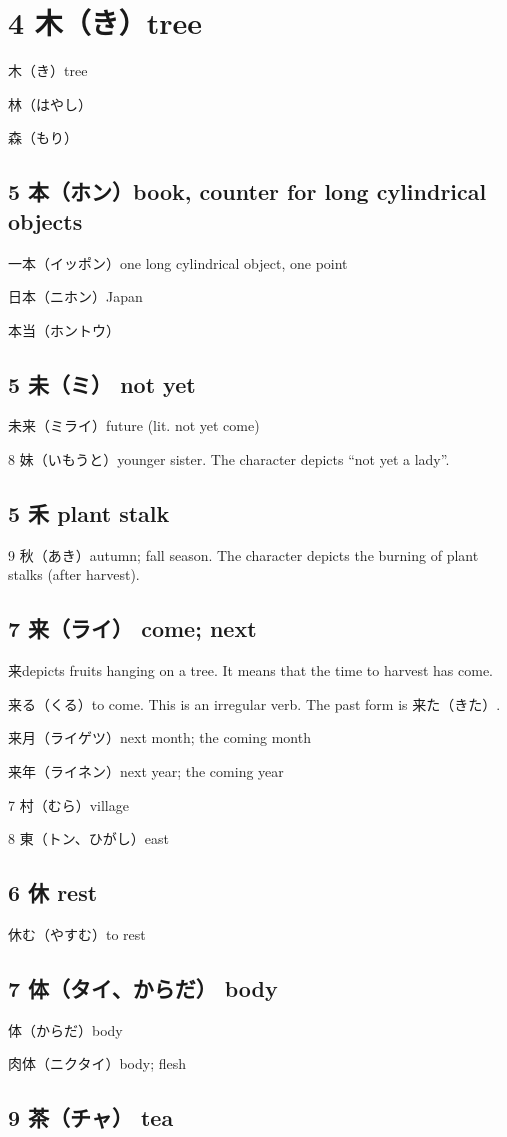\chapter{4 木（き）tree}

木（き）tree

林（はやし）

森（もり）

\section{5 本（ホン）book, counter for long cylindrical objects}

一本（イッポン）one long cylindrical object, one point

日本（ニホン）Japan

本当（ホントウ）

\section{5 未（ミ） not yet}

未来（ミライ）future (lit. not yet come)

8 妹（いもうと）younger sister.
The character depicts ``not yet a lady''.

\section{5 禾 plant stalk}

9 秋（あき）autumn; fall season.
The character depicts the burning of plant stalks (after harvest).

\section{7 来（ライ） come; next}

来depicts fruits hanging on a tree.
It means that the time to harvest has come.

来る（くる）to come. This is an irregular verb. The past form is 来た（きた）.

来月（ライゲツ）next month; the coming month

来年（ライネン）next year; the coming year

7 村（むら）village

8 東（トン、ひがし）east

\section{6 休 rest}

休む（やすむ）to rest

\section{7 体（タイ、からだ） body}

体（からだ）body

肉体（ニクタイ）body; flesh

\section{9 茶（チャ） tea}
